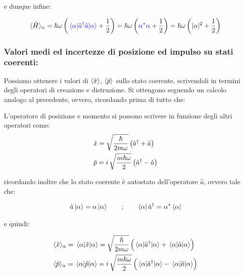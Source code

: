 	e dunque infine:

\begin{nb}
\begin{align*}
	\langle \hat{H} \rangle_{\alpha} = \hbar \omega \, \qty( \textcolor{blue}{\mel{\alpha}{\hat{a}^{\dagger}\hat{a}}{\alpha}} +\frac{1}{2}) = \hbar \omega \, \qty( \textcolor{blue}{\alpha^* \alpha} +\frac{1}{2}) = \hbar \omega \, \qty( |\alpha|^2 +\frac{1}{2}) 
\end{align*}
\end{nb}
	
\subsubsection{Valori medi ed incertezze di posizione ed impulso su stati coerenti:}
	
	Possiamo ottenere i valori di $\langle \hat{x} \rangle$, $\langle \hat{p} \rangle$ sullo stato coerente, scrivendoli in termini degli operatori di creazione e distruzione. Si ottengono seguendo un calcolo analogo al precedente, ovvero, ricordando prima di tutto che:
	
\begin{nb}
	L'operatore di posizione e momento si possono scrivere in funzione degli altri operatori come:
\begin{align*}
	& \hat{x} = \sqrt{\frac{\hbar}{2m\omega}} \, \qty(\hat{a}^{\dagger} + \hat{a})\\
	& \hat{p} = i \, \sqrt{\frac{m\hbar\omega}{2}} \, \qty(\hat{a}^{\dagger} - \hat{a})
\end{align*}
\end{nb}
	
	ricordando inoltre che lo stato coerente è autostato dell'operatore $\hat{a}$, ovvero tale che:
	
\begin{align*}
	\hat{a} \ket{\alpha} = \alpha \ket{\alpha} \qquad ; \qquad \bra{\alpha} \hat{a}^{\dagger} = \alpha^* \bra{\alpha}
\end{align*}
	
	e quindi:
	
\begin{align*}
	& \langle \hat{x} \rangle_{\alpha} = \mel{\alpha}{\hat{x}}{\alpha} = \sqrt{\frac{\hbar}{2m\omega}} \, \qty\Big(\mel{\alpha}{\hat{a}^{\dagger}}{\alpha} + \mel{\alpha}{\hat{a}}{\alpha})  \\
	& \langle \hat{p} \rangle_{\alpha} = \mel{\alpha}{\hat{p}}{\alpha} = i \, \sqrt{\frac{m\hbar\omega}{2}} \, \qty\Big(\mel{\alpha}{\hat{a}^{\dagger}}{\alpha} - \mel{\alpha}{\hat{a}}{\alpha})
\end{align*}


